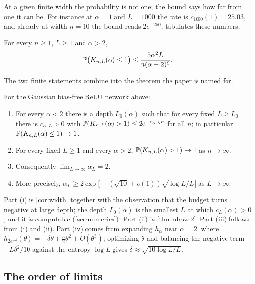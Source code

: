 At a given finite width the probability is not one; the bound says how far from one it can be. For instance at $\alpha=1$ and $L=1000$ the rate is $c_{1000}(1)=25.03$, and already at width $n=10$ the bound reads $2e^{-250}$.  tabulates these numbers.

\begin{theorem}\label{thm:above2}
For every $n\ge 1$, $L\ge 1$ and $\alpha>2$,
\[
\mathbb{P}\bigl(K_{n,L}(\alpha)\le 1\bigr)\le\frac{5\alpha^2 L}{n(\alpha-2)^2}.
\]
\end{theorem}

The two finite statements combine into the theorem the paper is named for.

\begin{theorem}\label{thm:main}
For the Gaussian bias-free ReLU network above:
\begin{enumerate}
\item[(i)] For every $\alpha<2$ there is a depth $L_0(\alpha)$ such that for every fixed $L\ge L_0$ there is $c_{\alpha,L}>0$ with $\mathbb{P}(K_{n,L}(\alpha)>1)\le 2e^{-c_{\alpha,L}n}$ for all $n$; in particular $\mathbb{P}(K_{n,L}(\alpha)\le 1)\to 1$.
\item[(ii)] For every fixed $L\ge 1$ and every $\alpha>2$, $\mathbb{P}(K_{n,L}(\alpha)>1)\to 1$ as $n\to\infty$.
\item[(iii)] Consequently $\lim_{L\to\infty}\alpha_L=2$.
\item[(iv)] More precisely, $\alpha_L\ge 2\exp\bigl[-(\sqrt{10}+o(1))\sqrt{\log L/L}\bigr]$ as $L\to\infty$.
\end{enumerate}
\end{theorem}

Part (i) is \cref{cor:width} together with the observation that the budget turns negative at large depth; the depth $L_0(\alpha)$ is the smallest $L$ at which $c_L(\alpha)>0$, and it is computable (\cref{sec:numerics}). Part (ii) is \cref{thm:above2}. Part (iii) follows from (i) and (ii). Part (iv) comes from expanding $h_\alpha$ near $\alpha=2$, where $h_{2e^{-\delta}}(\theta)=-\delta\theta+\tfrac52\theta^2+O(\theta^3)$; optimizing $\theta$ and balancing the negative term $-L\delta^2/10$ against the entropy $\log L$ gives $\delta\approx\sqrt{10\log L/L}$.

\subsection{The order of limits}

